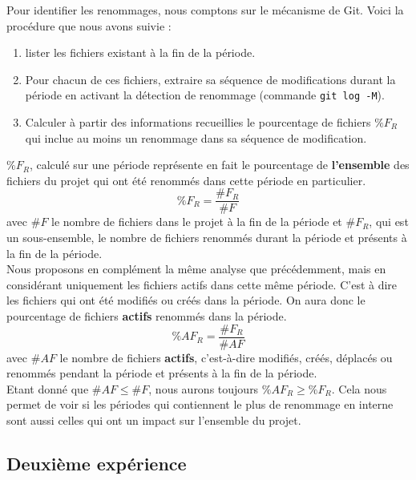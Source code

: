 Pour identifier les renommages, nous comptons sur le mécanisme de Git. Voici la procédure que nous avons suivie :
\begin{enumerate}
\item lister les fichiers existant à la fin de la période.
\item Pour chacun de ces fichiers, extraire sa séquence de modifications durant la période en activant la détection de renommage (commande \texttt{git log -M}).
\item Calculer à partir des informations recueillies le pourcentage de fichiers $\%F_{R}$ qui inclue au moins un renommage dans sa séquence de modification.
\end{enumerate}
\medskip

$\%F_{R}$, calculé sur une période représente en fait le pourcentage de \textbf{l'ensemble} des fichiers du projet qui ont été renommés dans cette période en particulier. \[\%F_{R} = \frac{\#F_{R}}{\#F}\] avec $\#F$ le nombre de fichiers dans le projet à la fin de la période et $\#F_{R}$, qui est un sous-ensemble, le nombre de fichiers renommés durant la période et présents à la fin de la période.\\

Nous proposons en complément la même analyse que précédemment, mais en considérant uniquement les fichiers actifs dans cette même période. C'est à dire les fichiers qui ont été modifiés ou créés dans la période. On aura donc le pourcentage de fichiers \textbf{actifs} renommés dans la période. 
\[\%AF_{R} = \frac{\#F_{R}}{\#AF}\] avec $\#AF$ le nombre de fichiers \textbf{actifs}, c'est-à-dire modifiés, créés, déplacés ou renommés pendant la période et présents à la fin de la période.\\

Etant donné que ${\#AF} \le {\#F}$, nous aurons toujours $\%AF_{R} \geq \%F_{R}$. Cela nous permet de voir si les périodes qui contiennent le plus de renommage en interne sont aussi celles qui ont un impact sur l'ensemble du projet.\\


\subsection{Deuxième expérience}

